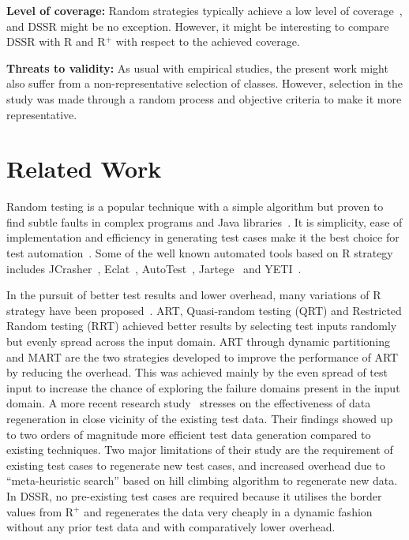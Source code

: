 \textbf{Level of coverage:} Random strategies typically achieve a low level of coverage~\cite{offutt1996semantic}, and DSSR might be no exception. However, it might be interesting to compare DSSR with R and R$^+$ with respect to the achieved coverage.

\textbf{Threats to validity:} As usual with empirical studies, the present work might also suffer from a non-representative selection of classes. However, selection in the study was made through a random process and objective criteria to make it more representative.




\section{Related Work}\label{sec:rw}

Random testing is a popular technique with a simple algorithm but proven to find subtle faults in complex programs and Java libraries~\cite{csallner2004jcrasher, pacheco2005eclat,claessen2011quickcheck}. It is simplicity, ease of implementation and efficiency in generating test cases make it the best choice for test automation~\cite{hamlet1994random}. Some of the well known automated tools based on R strategy includes JCrasher~\cite{csallner2004jcrasher}, Eclat~\cite{pacheco2005eclat}, AutoTest~\cite{ciupa2007experimental, ciupa2008artoo}, Jartege~\cite{oriat2005jartege} and YETI~\cite{oriol2010yeti, oriol2012random}.

In the pursuit of better test results and lower overhead, many variations of R strategy have been proposed~\cite{chen2004mirror, chan2006restricted, chen2007quasi, chen2010adaptive, chen2004adaptive}. ART, Quasi-random testing (QRT) and Restricted Random testing (RRT) achieved better results by selecting test inputs randomly but evenly spread across the input domain. ART through dynamic partitioning and MART are the two strategies developed to improve the performance of ART by reducing the overhead. This was achieved mainly by the even spread of test input to increase the chance of exploring the failure domains present in the input domain. A more recent research study~\cite{yoo2012test} stresses on the effectiveness of data regeneration in close vicinity of the existing test data. Their findings showed up to two orders of magnitude more efficient test data generation compared to existing techniques. Two major limitations of their study are the requirement of existing test cases to regenerate new test cases, and increased overhead due to ``meta-heuristic search'' based on hill climbing algorithm to regenerate new data. In DSSR, no pre-existing test cases are required because it utilises the border values from R$^+$ and regenerates the data very cheaply in a dynamic fashion without any prior test data and with comparatively lower overhead. 
  
